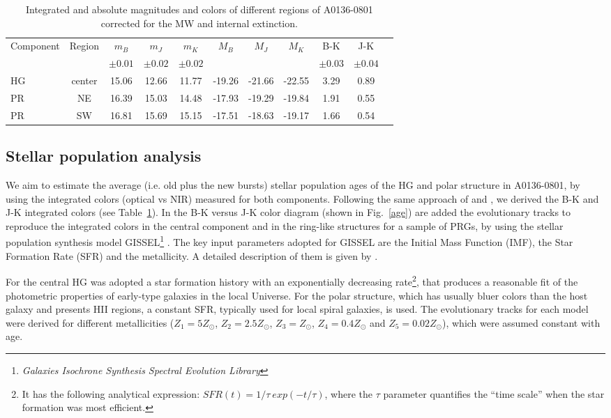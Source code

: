 \documentclass[useAMS,usenatbib]{mn2e}
\begin{document}
\begin{table}
\begin{minipage}{100mm}
\caption{\label{magnitudes}Integrated and absolute magnitudes and colors of different regions of A0136-0801 corrected for the MW and internal extinction.}
\begin{tabular}{lcccccccccc}
\hline\hline
Component& Region & $m_{B}$ & $m_{J} $ & $m_{K} $ & $M_{B}$ & $M_{J}$ & $M_{K}$ & B-K & J-K\\
         &        & $\pm 0.01$   & $\pm 0.02$   & $\pm 0.02$    &        & & & $\pm 0.03$& $\pm 0.04$\\
\hline
HG & center & 15.06 & 12.66 & 11.77 &-19.26 & -21.66 & -22.55 & 3.29 & 0.89\\
PR & NE & 16.39 &15.03 & 14.48 &-17.93&-19.29&-19.84& 1.91 & 0.55\\
PR & SW & 16.81 &15.69 & 15.15 &-17.51&-18.63&-19.17& 1.66 & 0.54\\
\hline
\end{tabular}
\end{minipage}
\end{table}


\subsection{Stellar population analysis}

We aim to estimate the average (i.e. old plus the new bursts) stellar
population ages of the HG and polar structure in A0136-0801, by using
the integrated colors (optical vs NIR) measured for both components.
Following the same approach of \citet{Iod02a} and \citet{Iod02b}, we
derived the B-K and J-K integrated colors (see
Table~\ref{magnitudes}).  In the B-K versus J-K color diagram (shown
in Fig.~\ref{age}) are added the evolutionary tracks to reproduce the
integrated colors in the central component and in the ring-like
structures for a sample of PRGs, by using the stellar population
synthesis model GISSEL\footnote{\it Galaxies Isochrone Synthesis
  Spectral Evolution Library} \citep{Bru03}. The key input parameters
adopted for GISSEL are the Initial Mass Function (IMF), the Star
Formation Rate (SFR) and the metallicity. A detailed description of
them is given by \citet{Iod02b}.

For the central HG was adopted a star formation history with an
exponentially decreasing rate\footnote{It has the following analytical
  expression: $SFR(t) =1/\tau\ exp (-t/\tau)$, where the $\tau$
  parameter quantifies the ``time scale'' when the star formation was
  most efficient.}, that produces a reasonable fit of the photometric
properties of early-type galaxies in the local Universe.  For the
polar structure, which has usually bluer colors than the host galaxy
and presents HII regions, a constant SFR, typically used for local spiral galaxies, is used. The evolutionary tracks for each model were derived
for different metallicities ($Z_1= 5 Z_{\odot}$, $Z_2=2.5Z_{\odot}$, $Z_3=Z_{\odot}$, $Z_4=0.4Z_{\odot}$ and $Z_5=0.02Z_{\odot}$), which were assumed constant with age.
\end{document}
